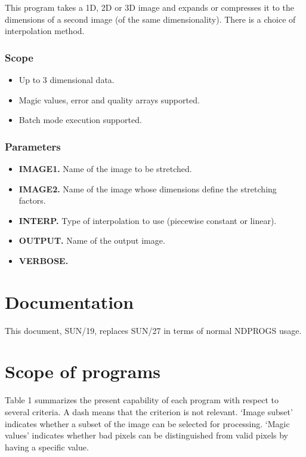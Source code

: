 This program takes a 1D, 2D or 3D image and expands or compresses it to the
dimensions of a second image (of the same dimensionality). There is a choice of
interpolation method.

\subsubsection{Scope}

\begin{itemize}
\item Up to 3 dimensional data.
\item Magic values, error and quality arrays supported.
\item Batch mode execution supported.
\end {itemize}

\subsubsection{Parameters}

\begin{itemize}
\item {\bf IMAGE1.} Name of the image to be stretched.
\item {\bf IMAGE2.} Name of the image whose dimensions define the stretching
factors.
\item {\bf INTERP.} Type of interpolation to use (piecewise constant or
linear).
\item {\bf OUTPUT.} Name of the output image.
\item {\bf VERBOSE.}
\end{itemize}

\section{Documentation{}}
\label{sec:documentation}

This document, SUN/19, replaces SUN/27 in terms of normal NDPROGS usage.

\section{Scope of programs{}}
\label{sec:scope}

Table 1 summarizes the present capability of each program with respect
to several criteria. A dash means that the criterion is not relevant.
`Image subset' indicates whether a subset of the image can be selected for
processing. `Magic values' indicates whether bad pixels can be distinguished
from valid pixels by having a specific value.

